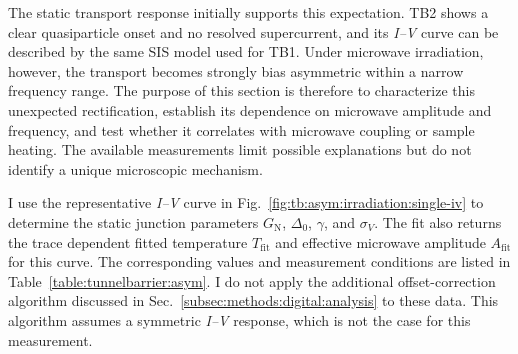         The static transport response initially supports this expectation. TB2 shows a clear quasiparticle onset and no resolved supercurrent, and its \textit{I--V} curve can be described by the same SIS model used for TB1. Under microwave irradiation, however, the transport becomes strongly bias asymmetric within a narrow frequency range. The purpose of this section is therefore to characterize this unexpected rectification, establish its dependence on microwave amplitude and frequency, and test whether it correlates with microwave coupling or sample heating. The available measurements limit possible explanations but do not identify a unique microscopic mechanism.

        I use the representative \textit{I--V} curve in Fig.~\ref{fig:tb:asym:irradiation:single-iv} to determine the static junction parameters $G_\mathrm{N}$, $\Delta_0$, $\gamma$, and $\sigma_V$. The fit also returns the trace dependent fitted temperature $T_\mathrm{fit}$ and effective microwave amplitude $A_\mathrm{fit}$ for this curve. The corresponding values and measurement conditions are listed in Table~\ref{table:tunnelbarrier:asym}. I do not apply the additional offset-correction algorithm discussed in Sec.~\ref{subsec:methods:digital:analysis} to these data. This algorithm assumes a symmetric \textit{I--V} response, which is not the case for this measurement.


